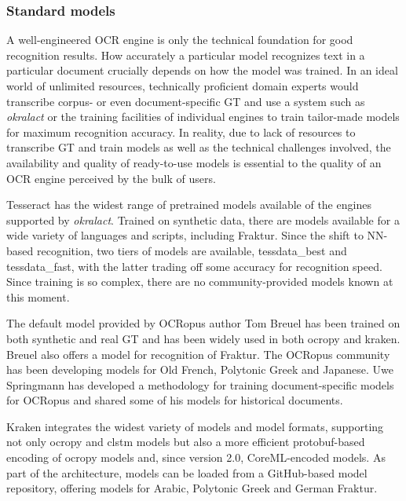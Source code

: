 \documentclass[sigconf]{acmart}
\begin{document}
\subsubsection{Standard models}
\label{sec:models}

A well-engineered OCR engine is only the technical foundation for
good recognition results. How accurately a particular model recognizes text
in a particular document crucially depends on how the model was trained. In
an ideal world of unlimited resources, technically proficient domain experts
would transcribe corpus- or even document-specific GT and use a system such as
\textit{okralact} or the training facilities of individual engines to train
tailor-made models for maximum recognition accuracy. In reality, due to lack of
resources to transcribe GT and train models as well as the technical
challenges involved, the availability and quality of ready-to-use models is 
essential to the quality of an OCR engine perceived by the bulk of users.

Tesseract has the widest range of pretrained models available of the engines
supported by \textit{okralact}. Trained on synthetic data, there are models available
for a wide variety of languages and scripts, including Fraktur. Since the shift
to NN-based recognition, two tiers of models are available, tessdata\_best and
tessdata\_fast, with the latter trading off some accuracy for recognition speed. 
Since training is so complex, there are no community-provided models known 
at this moment.


The default model provided by OCRopus author Tom Breuel has been trained on
both synthetic and real GT and has been widely used in both ocropy and kraken.
Breuel also offers a model for recognition of Fraktur. The OCRopus community
has been developing models for Old French, Polytonic Greek and Japanese. Uwe
Springmann has developed a methodology for training document-specific models
for OCRopus and shared some of his models for historical documents.

Kraken integrates the widest variety of models and model formats,
supporting not only ocropy and clstm models but also a more efficient
protobuf-based encoding of ocropy models and, since version 2.0, CoreML-encoded
models. As part of the architecture, models can be loaded from a GitHub-based
model repository, offering models for Arabic, Polytonic Greek and German Fraktur.

\end{document}
